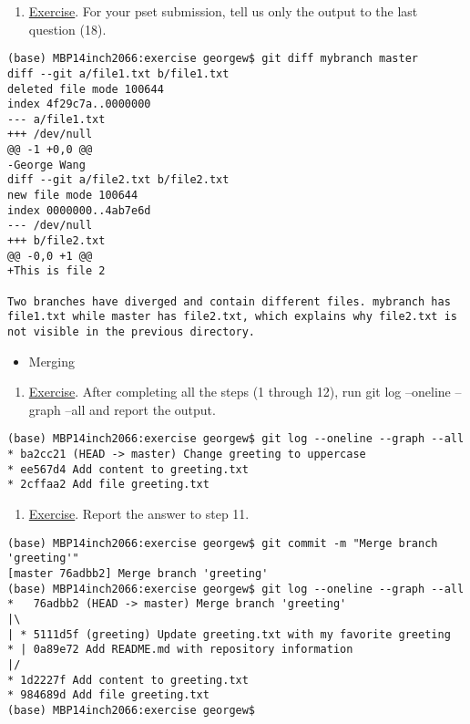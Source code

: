 \documentclass[
  letterpaper,
  DIV=11,
  numbers=noendperiod]{scrartcl}
\providecommand{\tightlist}{%
  \setlength{\itemsep}{0pt}\setlength{\parskip}{0pt}}\usepackage{longtable,booktabs,array}
\begin{document}
\begin{enumerate}
\def\labelenumi{\arabic{enumi}.}
\setcounter{enumi}{1}
\tightlist
\item
  \href{https://github.com/eficode-academy/git-katas/blob/master/basic-branching/README.md}{Exercise}.
  For your pset submission, tell us only the output to the last question
  (18).
\end{enumerate}

\begin{verbatim}
(base) MBP14inch2066:exercise georgew$ git diff mybranch master
diff --git a/file1.txt b/file1.txt
deleted file mode 100644
index 4f29c7a..0000000
--- a/file1.txt
+++ /dev/null
@@ -1 +0,0 @@
-George Wang
diff --git a/file2.txt b/file2.txt
new file mode 100644
index 0000000..4ab7e6d
--- /dev/null
+++ b/file2.txt
@@ -0,0 +1 @@
+This is file 2

Two branches have diverged and contain different files. mybranch has file1.txt while master has file2.txt, which explains why file2.txt is not visible in the previous directory.
\end{verbatim}

\begin{itemize}
\tightlist
\item
  Merging
\end{itemize}

\begin{enumerate}
\def\labelenumi{\arabic{enumi}.}
\tightlist
\item
  \href{https://github.com/eficode-academy/git-katas/blob/master/ff-merge/README.md}{Exercise}.
  After completing all the steps (1 through 12), run git log --oneline
  --graph --all and report the output.
\end{enumerate}

\begin{verbatim}
(base) MBP14inch2066:exercise georgew$ git log --oneline --graph --all
* ba2cc21 (HEAD -> master) Change greeting to uppercase
* ee567d4 Add content to greeting.txt
* 2cffaa2 Add file greeting.txt
\end{verbatim}

\begin{enumerate}
\def\labelenumi{\arabic{enumi}.}
\setcounter{enumi}{1}
\tightlist
\item
  \href{https://github.com/eficode-academy/git-katas/blob/master/3-way-merge/README.md}{Exercise}.
  Report the answer to step 11.
\end{enumerate}

\begin{verbatim}
(base) MBP14inch2066:exercise georgew$ git commit -m "Merge branch 'greeting'"
[master 76adbb2] Merge branch 'greeting'
(base) MBP14inch2066:exercise georgew$ git log --oneline --graph --all
*   76adbb2 (HEAD -> master) Merge branch 'greeting'
|\  
| * 5111d5f (greeting) Update greeting.txt with my favorite greeting
* | 0a89e72 Add README.md with repository information
|/  
* 1d2227f Add content to greeting.txt
* 984689d Add file greeting.txt
(base) MBP14inch2066:exercise georgew$ 
\end{verbatim}
\end{document}
